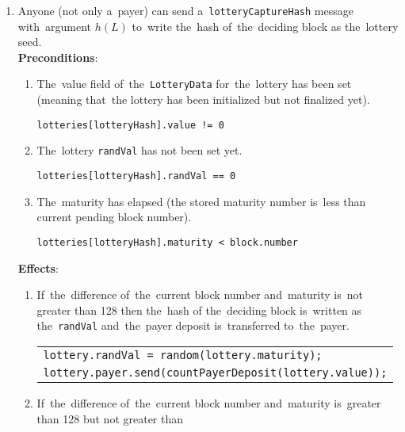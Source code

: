 \documentclass[a4paper]{article}
\begin{document}
\begin{enumerate}
        \item Anyone (not only a~payer) can send a~\texttt{lotteryCaptureHash} message with~argument $h(L)$ to~write
            the~hash of~the~deciding block as the~lottery seed.\\
            \textbf{Preconditions}:
            \begin{enumerate}
                \item The~value field of~the~\texttt{LotteryData} for~the~lottery has been set (meaning that~the
                lottery has been initialized but not finalized yet).
                    \begin{center}
	                    \texttt{lotteries[lotteryHash].value != 0}
                    \end{center}
                \item The~lottery \texttt{randVal} has not been set yet.
                    \begin{center}
	                    \texttt{lotteries[lotteryHash].randVal == 0}
	                \end{center}
                \item The~maturity has elapsed (the stored maturity number is~less than current pending block number).
                    \begin{center}
                	    \texttt{lotteries[lotteryHash].maturity < block.number}
                	\end{center}
	        \end{enumerate}
        \textbf{Effects}:
        \begin{enumerate}
            \item  If~the~difference of~the~current block number and~maturity is~not greater than 128 then the~hash of
                the~deciding block is~written as the~\texttt{randVal} and~the~payer deposit is~transferred to~the~payer.
                \begin{center}
                    \begin{tabular}{l}
                        \texttt{lottery.randVal = random(lottery.maturity);}\\
                        \texttt{lottery.payer.send(countPayerDeposit(lottery.value));}
                    \end{tabular}
                \end{center}
            \item If~the~difference of~the~current block number and~maturity is~greater than 128 but not greater than

\end{enumerate}
\end{enumerate}
\end{document}
